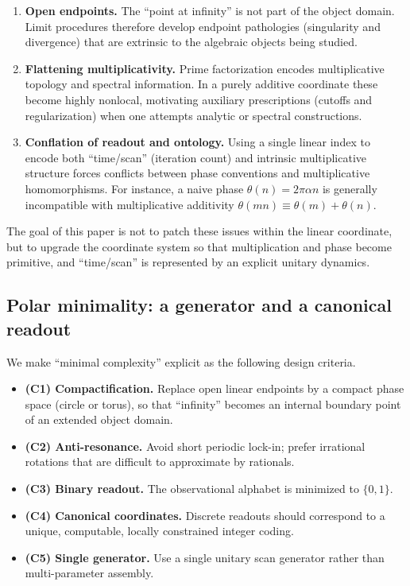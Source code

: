 \begin{enumerate}
    \item \textbf{Open endpoints.} The ``point at infinity'' is not part of the object domain. Limit procedures therefore develop endpoint pathologies (singularity and divergence) that are extrinsic to the algebraic objects being studied.
    \item \textbf{Flattening multiplicativity.} Prime factorization encodes multiplicative topology and spectral information. In a purely additive coordinate these become highly nonlocal, motivating auxiliary prescriptions (cutoffs and regularization) when one attempts analytic or spectral constructions.
    \item \textbf{Conflation of readout and ontology.} Using a single linear index to encode both ``time/scan'' (iteration count) and intrinsic multiplicative structure forces conflicts between phase conventions and multiplicative homomorphisms. For instance, a naive phase $\theta(n)=2\pi\alpha n$ is generally incompatible with multiplicative additivity $\theta(mn)\equiv\theta(m)+\theta(n)$.
\end{enumerate}

The goal of this paper is not to patch these issues within the linear coordinate, but to upgrade the coordinate system so that multiplication and phase become primitive, and ``time/scan'' is represented by an explicit unitary dynamics.

\subsection{Polar minimality: a generator and a canonical readout}
We make ``minimal complexity'' explicit as the following design criteria.

\begin{itemize}
    \item \textbf{(C1) Compactification.} Replace open linear endpoints by a compact phase space (circle or torus), so that ``infinity'' becomes an internal boundary point of an extended object domain.
    \item \textbf{(C2) Anti-resonance.} Avoid short periodic lock-in; prefer irrational rotations that are difficult to approximate by rationals.
    \item \textbf{(C3) Binary readout.} The observational alphabet is minimized to $\{0,1\}$.
    \item \textbf{(C4) Canonical coordinates.} Discrete readouts should correspond to a unique, computable, locally constrained integer coding.
    \item \textbf{(C5) Single generator.} Use a single unitary scan generator rather than multi-parameter assembly.
\end{itemize}

